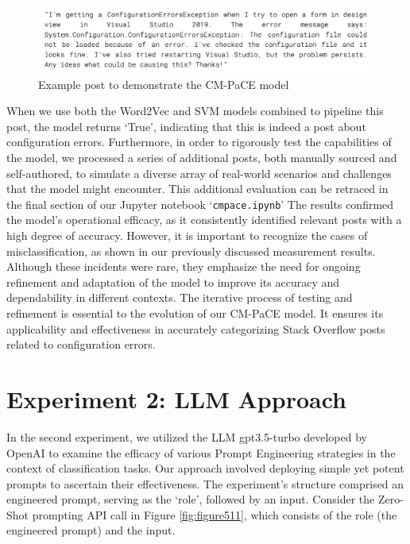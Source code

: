 \documentclass[english,bachelor]{swsLeipzig}
\begin{document}
\begin{figure}[h]
  \centering
  \includegraphics[width=1\textwidth]{images/examplepost.png}
  \caption{Example post to demonstrate the CM-PaCE model}
  \label{fig:figure59}
\end{figure}

When we use both the Word2Vec and SVM models combined to pipeline this post, the model returns 
`True', indicating that this is indeed a post about configuration errors. Furthermore, in order to rigorously test the capabilities of the model, we processed a series of additional posts, both manually sourced and self-authored, to simulate a diverse array of real-world scenarios and challenges that the model might encounter. This additional evaluation can be retraced in the final section of our Jupyter notebook `\texttt{cmpace.ipynb}' The results confirmed the model's operational efficacy, as it consistently identified relevant posts with a high degree of accuracy. However, it is important to recognize the cases of misclassification, as shown in our previously discussed measurement results. Although these incidents were rare, they emphasize the need for ongoing refinement and adaptation of the model to improve its accuracy and dependability in different contexts. The iterative process of testing and refinement is essential to the evolution of our CM-PaCE model. It ensures its applicability and effectiveness in accurately categorizing Stack Overflow posts related to configuration errors.

\section{Experiment 2: LLM Approach}

In the second experiment, we utilized the LLM gpt3.5-turbo developed by OpenAI 
to examine the efficacy of various Prompt Engineering strategies in the context of classification tasks. Our approach involved deploying simple yet potent prompts to ascertain their effectiveness. The experiment's structure comprised an engineered prompt, serving as the `role', followed by an input. Consider the Zero-Shot prompting API call in Figure \ref{fig:figure511}, which consists of the role (the engineered prompt) and the input.
\end{document}
